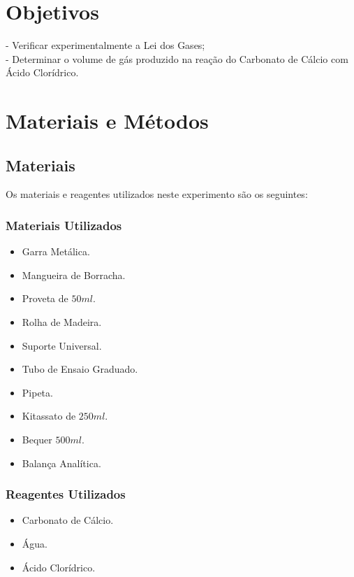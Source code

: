 \documentclass[a4paper, 11pt]{article}
\begin{document}
    \section{Objetivos}\label{sec:objetivos}

    \indent - Verificar experimentalmente a Lei dos Gases; \\
    \indent - Determinar o volume de gás produzido na reação do Carbonato de Cálcio com Ácido Clorídrico\@.

    \section{Materiais e Métodos}\label{sec:materiais_metodos}
    \subsection{Materiais}\label{sec:materiais}
    \indent Os materiais e reagentes utilizados neste experimento são os seguintes\@:
    \subsubsection{Materiais Utilizados}\label{sec:materiais_utilizados}
    \begin{itemize}
        \item Garra Metálica\@.
        \item Mangueira de Borracha\@.
        \item Proveta de $50ml$\@.
        \item Rolha de Madeira\@.
        \item Suporte Universal\@.
        \item Tubo de Ensaio Graduado\@.
        \item Pipeta\@.
        \item Kitassato de $250ml$\@.
        \item Bequer $500ml$\@.
        \item Balança Analítica\@.
    \end{itemize}
    \doublespacing
    \subsubsection{Reagentes Utilizados}\label{sec:reagentes_utilizados}
    \begin{itemize}
        \item Carbonato de Cálcio\@.
        \item Água\@.
        \item Ácido Clorídrico\@.
    \end{itemize}
    \doublespacing
\end{document}
